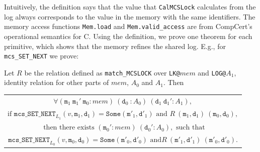 Intuitively, the definition says that the value that
\lstinline$CalMCSLock$ calculates from the log always corresponds to the value 
in the memory with the same identifiers. The memory access functions \lstinline$Mem.load$ and \lstinline$Mem.valid_access$ are
from CompCert's operational semantics for C.
Using the definition, we prove one theorem for each primitive, which
shows that the memory refines the shared log. E.g., for \lstinline$mcs_SET_NEXT$ we prove:

\begin{theorem}
  \label{thm:machine-state-refinement} Let $R$ be the relation defined as \lstinline$match_MCSLOCK$ 
over \lstinline$LK@$$mem$ and \lstinline$LOG@$$A_1$, 
identity relation for other parts of $mem$, $A_0$ and $A_1$. Then
 \begin{center}
 \begin{tabular}{c}
$ \forall (\mathrm{\texttt{m}}_{1} \ \mathrm{\texttt{m}}_{1}'\ \mathrm{\texttt{m}}_{0} : mem)\  (\mathrm{\texttt{d}}_{0} \ : A_0)\ (\mathrm{\texttt{d}}_{1} \ \mathrm{\texttt{d}}_{1}' : A_1),$ \\
$ \mbox{if } \mathrm{\texttt{mcs\_SET\_NEXT}}_{L_1}(v, \mathrm{\texttt{m}}_1, \mathrm{\texttt{d}}_1) = \mathrm{\texttt{Some}}(\mathrm{\texttt{m}}'_1, \mathrm{\texttt{d}}'_1) \mbox{ and }
  R\ (\mathrm{\texttt{m}}_1, \mathrm{\texttt{d}}_1)\ (\mathrm{\texttt{m}}_0, \mathrm{\texttt{d}}_0),$\\
  $ \mbox{ then there exists } (\mathrm{\texttt{m}}_{0}' : mem)\ (\mathrm{\texttt{d}}_{0}' : A_0), \mbox{ such that}$\\
$  \mathrm{\texttt{mcs\_SET\_NEXT}}_{L_0}(v, \mathrm{\texttt{m}}_0, \mathrm{\texttt{d}}_0) = \mathrm{\texttt{Some}}(\mathrm{\texttt{m}}'_0, \mathrm{\texttt{d}}'_0) \mbox{ and}
  R\ (\mathrm{\texttt{m}}'_1, \mathrm{\texttt{d}}'_1)\ (\mathrm{\texttt{m}}'_0, \mathrm{\texttt{d}}'_0).$ 
   \end{tabular}
 \end{center}
\end{theorem}


